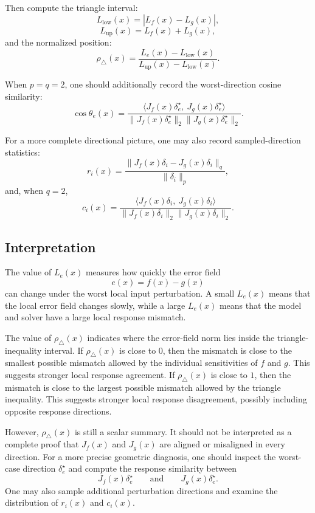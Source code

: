 \documentclass{article}
\begin{document}
Then compute the triangle interval:
\[
L_{\mathrm{low}}(x)=|L_f(x)-L_g(x)|,
\]
\[
L_{\mathrm{up}}(x)=L_f(x)+L_g(x),
\]
and the normalized position:
\[
\rho_{\triangle}(x)
=
\frac{
L_e(x)-L_{\mathrm{low}}(x)
}{
L_{\mathrm{up}}(x)-L_{\mathrm{low}}(x)
}.
\]

When \(p=q=2\), one should additionally record the worst-direction cosine similarity:
\[
\cos\theta_e(x)
=
\frac{
\langle J_f(x)\delta_e^\star,\ J_g(x)\delta_e^\star\rangle
}{
\|J_f(x)\delta_e^\star\|_2
\|J_g(x)\delta_e^\star\|_2
}.
\]

For a more complete directional picture, one may also record sampled-direction statistics:
\[
r_i(x)
=
\frac{
\|J_f(x)\delta_i-J_g(x)\delta_i\|_q
}{
\|\delta_i\|_p
},
\]
and, when \(q=2\),
\[
c_i(x)
=
\frac{
\langle J_f(x)\delta_i,\ J_g(x)\delta_i\rangle
}{
\|J_f(x)\delta_i\|_2
\|J_g(x)\delta_i\|_2
}.
\]

\subsection{Interpretation}

The value of \(L_e(x)\) measures how quickly the error field
\[
e(x)=f(x)-g(x)
\]
can change under the worst local input perturbation. A small \(L_e(x)\) means that the local error field changes slowly, while a large \(L_e(x)\) means that the model and solver have a large local response mismatch.

The value of \(\rho_{\triangle}(x)\) indicates where the error-field norm lies inside the triangle-inequality interval. If \(\rho_{\triangle}(x)\) is close to \(0\), then the mismatch is close to the smallest possible mismatch allowed by the individual sensitivities of \(f\) and \(g\). This suggests stronger local response agreement. If \(\rho_{\triangle}(x)\) is close to \(1\), then the mismatch is close to the largest possible mismatch allowed by the triangle inequality. This suggests stronger local response disagreement, possibly including opposite response directions.

However, \(\rho_{\triangle}(x)\) is still a scalar summary. It should not be interpreted as a complete proof that \(J_f(x)\) and \(J_g(x)\) are aligned or misaligned in every direction. For a more precise geometric diagnosis, one should inspect the worst-case direction \(\delta_e^\star\) and compute the response similarity between
\[
J_f(x)\delta_e^\star
\qquad\text{and}\qquad
J_g(x)\delta_e^\star.
\]
One may also sample additional perturbation directions and examine the distribution of \(r_i(x)\) and \(c_i(x)\).
\end{document}
